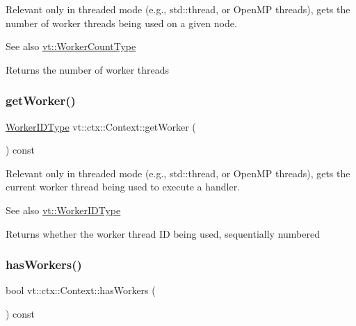 Relevant only in threaded mode (e.\+g., {\ttfamily std\+::thread}, or Open\+MP threads), gets the number of worker threads being used on a given node. 

\begin{DoxySeeAlso}{See also}
{\ttfamily \hyperlink{namespacevt_aa93398ea48f2cb6c188512250f7cc248}{vt\+::\+Worker\+Count\+Type}} 
\end{DoxySeeAlso}
\begin{DoxyReturn}{Returns}
the number of worker threads 
\end{DoxyReturn}
\mbox{\label{structvt_1_1ctx_1_1_context_a1e39e0561109fd30b45a427ddb055cd2}} 
\subsubsection{\texorpdfstring{get\+Worker()}{getWorker()}}
{\footnotesize\ttfamily \hyperlink{namespacevt_a656e362091da17b9b93d0655b36e3392}{Worker\+I\+D\+Type} vt\+::ctx\+::\+Context\+::get\+Worker (\begin{DoxyParamCaption}{ }\end{DoxyParamCaption}) const\hspace{0.3cm}{\ttfamily [inline]}}



Relevant only in threaded mode (e.\+g., {\ttfamily std\+::thread}, or Open\+MP threads), gets the current worker thread being used to execute a handler. 

\begin{DoxySeeAlso}{See also}
{\ttfamily \hyperlink{namespacevt_a656e362091da17b9b93d0655b36e3392}{vt\+::\+Worker\+I\+D\+Type}} 
\end{DoxySeeAlso}
\begin{DoxyReturn}{Returns}
whether the worker thread ID being used, sequentially numbered 
\end{DoxyReturn}
\mbox{\label{structvt_1_1ctx_1_1_context_a17b1fd9fd7bfc2afdd55707d1f321f76}} 
\subsubsection{\texorpdfstring{has\+Workers()}{hasWorkers()}}
{\footnotesize\ttfamily bool vt\+::ctx\+::\+Context\+::has\+Workers (\begin{DoxyParamCaption}{ }\end{DoxyParamCaption}) const\hspace{0.3cm}{\ttfamily [inline]}}




